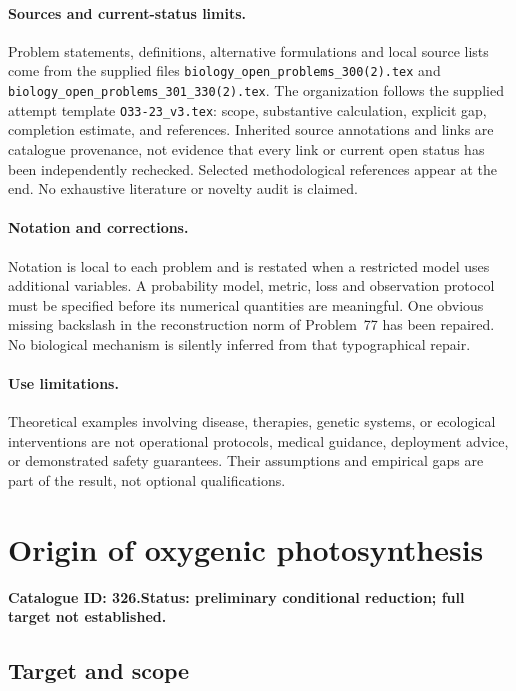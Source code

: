 \documentclass[11pt]{article}
\begin{document}
\paragraph{Sources and current-status limits.}
Problem statements, definitions, alternative formulations and local source lists
come from the supplied files
\texttt{biology\_open\_problems\_300(2).tex} and
\texttt{biology\_open\_problems\_301\_330(2).tex}.
The organization follows the supplied attempt template
\texttt{O33-23\_v3.tex}: scope, substantive calculation, explicit gap,
completion estimate, and references. Inherited source annotations and links are
catalogue provenance, not evidence that every link or current open status has
been independently rechecked. Selected methodological references appear at the
end. No exhaustive literature or novelty audit is claimed.

\paragraph{Notation and corrections.}
Notation is local to each problem and is restated when a restricted model uses
additional variables. A probability model, metric, loss and observation protocol
must be specified before its numerical quantities are meaningful. One obvious
missing backslash in the reconstruction norm of Problem~77 has been repaired.
No biological mechanism is silently inferred from that typographical repair.

\paragraph{Use limitations.}
Theoretical examples involving disease, therapies, genetic systems, or ecological
interventions are not operational protocols, medical guidance, deployment advice,
or demonstrated safety guarantees. Their assumptions and empirical gaps are part
of the result, not optional qualifications.

\setcounter{section}{325}
\section{Origin of oxygenic photosynthesis}
\label{prob:326}
\noindent\textbf{Catalogue ID: 326.}\quad \textbf{Status: preliminary conditional reduction; full target not established.}
\subsection{Target and scope}
\end{document}
